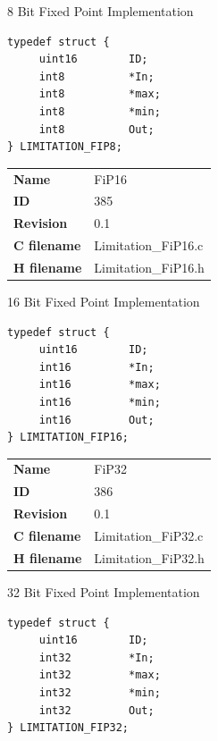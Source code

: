 8 Bit Fixed Point Implementation

\begin{lstlisting}
typedef struct {
     uint16        ID;
     int8          *In;
     int8          *max;
     int8          *min;
     int8          Out;
} LIMITATION_FIP8;
\end{lstlisting}

\ifdefined \AddTestReports
{}
\fi
{}
\nopagebreak[0]
\begin{tabular}{l l}
\textbf{Name} & FiP16 \tabularnewline
\textbf{ID} & 385 \tabularnewline
\textbf{Revision} & 0.1 \tabularnewline
\textbf{C filename} & Limitation\_FiP16.c \tabularnewline
\textbf{H filename} & Limitation\_FiP16.h \tabularnewline
\end{tabular}
\vspace{1ex}

16 Bit Fixed Point Implementation

\begin{lstlisting}
typedef struct {
     uint16        ID;
     int16         *In;
     int16         *max;
     int16         *min;
     int16         Out;
} LIMITATION_FIP16;
\end{lstlisting}

\ifdefined \AddTestReports
{}
\fi
{}
\nopagebreak[0]
\begin{tabular}{l l}
\textbf{Name} & FiP32 \tabularnewline
\textbf{ID} & 386 \tabularnewline
\textbf{Revision} & 0.1 \tabularnewline
\textbf{C filename} & Limitation\_FiP32.c \tabularnewline
\textbf{H filename} & Limitation\_FiP32.h \tabularnewline
\end{tabular}
\vspace{1ex}

32 Bit Fixed Point Implementation

\begin{lstlisting}
typedef struct {
     uint16        ID;
     int32         *In;
     int32         *max;
     int32         *min;
     int32         Out;
} LIMITATION_FIP32;
\end{lstlisting}

